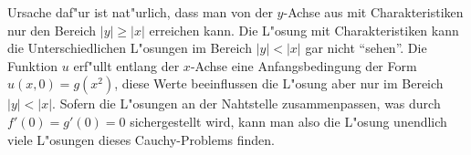 \begin{loesung}
Ursache daf"ur ist nat"urlich, dass man von der $y$-Achse aus mit
Charakteristiken nur den Bereich $|y|\ge |x|$ erreichen kann.
Die L"osung mit Charakteristiken kann die Unterschiedlichen L"osungen
im Bereich $|y|<|x|$ gar nicht ``sehen''.
Die Funktion $u$ erf"ullt entlang der $x$-Achse eine Anfangsbedingung
der Form $u(x,0)=g(x^2)$, diese Werte beeinflussen die L"osung aber
nur im Bereich $|y|<|x|$. Sofern die L"osungen an der Nahtstelle
zusammenpassen, was durch $f'(0)=g'(0)=0$ sichergestellt wird,
kann man also die L"osung unendlich viele L"osungen dieses Cauchy-Problems
finden.
\end{loesung}

